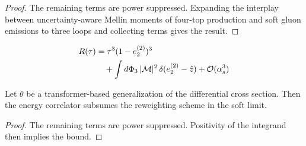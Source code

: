 \begin{proof}
The remaining terms are power suppressed. Expanding the interplay
between uncertainty-aware Mellin moments of four-top production and soft
gluon emissions to three loops and collecting terms gives the result.
\end{proof}

\begin{align}
  R(\tau) &= {\tau}^{3} (1 - e_2^{(2)})^{3} \nonumber \\
  &\quad + \int d\Phi_{3} \, |\mathcal{M}|^2 \, \delta(e_2^{(2)} - \hat{z}) + \mathcal{O}(\alpha_s^3) \label{eq:4}
\end{align}

\begin{lemma}[Factorization]\label{thm:3}
Let $\theta$ be a transformer-based generalization of the differential
cross section. Then the energy correlator subsumes the reweighting
scheme in the soft limit.
\end{lemma}

\begin{proof}
The remaining terms are power suppressed. Positivity of the integrand
then implies the bound.
\end{proof}

